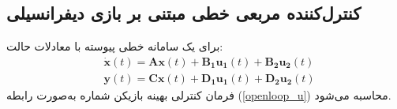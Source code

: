 

\subsection{کنترل‌کننده مربعی خطی مبتنی بر بازی دیفرانسیلی}\label{LQDG}
برای یک سامانه خطی پیوسته با معادلات حالت:
 \begin{equation}\label{systemlqdg}
 	\begin{split}
		&\boldsymbol{\dot x}(t) = \boldsymbol{Ax}(t) + \boldsymbol{B_1u_1}(t) + \boldsymbol{B_2u_2}(t)%
		\\
		&\boldsymbol{y}(t) = \boldsymbol{Cx}(t) + \boldsymbol{D_1u_1}(t) + \boldsymbol{D_2u_2}(t)
	\end{split}
\end{equation}
فرمان کنترلی بهینه  بازیکن شماره  به‌صورت رابطه
(\ref{openloop_u})
محاسبه می‌شود.

